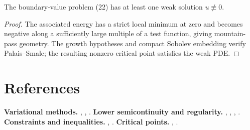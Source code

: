 \begin{theorem}
\label{thm:existence-nontrivial-solution-semilinear-elliptic}
The boundary-value problem (22) has at least one weak solution $u \not\equiv 0$.
\end{theorem}

\begin{proof}
\sketch The associated energy has a strict local minimum at zero and becomes negative along a sufficiently large multiple of a test function, giving mountain-pass geometry. The growth hypotheses and compact Sobolev embedding verify Palais--Smale; the resulting nonzero critical point satisfies the weak PDE.
\end{proof}

\section{References}
\label{sec:calculus-of-variations-references}
\textbf{Variational methods.} \cite{Giaquinta1983}, \cite{GiaquintaHildebrandt1996}, \cite{Zeidler1985}.
\textbf{Lower semicontinuity and regularity.} \cite{LadyzhenskayaUraltseva1968}, \cite{Giaquinta1983}, \cite{GilbargTrudinger1983}, \cite{GilbargTrudinger1983}.
\textbf{Constraints and inequalities.} \cite{KinderlehrerStampacchia1980}, \cite{DacorognaMoser1990}.
\textbf{Critical points.} \cite{Rabinowitz1986}, \cite{Giaquinta1983}.
